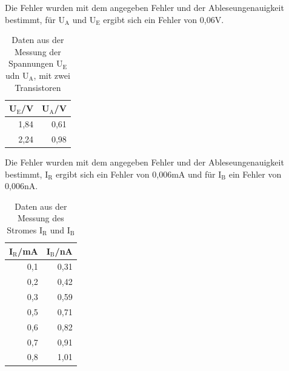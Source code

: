 \documentclass[12pt,a4paper]{article}
\begin{document}
Die Fehler wurden mit dem angegeben Fehler und der Ableseungenauigkeit bestimmt, für U$_\text{A}$ und U$_\text{E}$ ergibt sich ein Fehler von 0,06V.

\begin{table}[H]
\caption{Daten aus der Messung der Spannungen U$_\text{E}$ udn U$_\text{A}$, mit zwei Transistoren}
\begin{center}
\begin{tabular}{|r|r|}
\hline
\multicolumn{1}{|l|}{U$_\text{E}$/V} & \multicolumn{1}{l|}{U$_\text{A}$/V} \\ \hline
1,84 & 0,61 \\ \hline
2,24 & 0,98 \\ \hline
\end{tabular}
\end{center}
\label{tab:a_3b_u}
\end{table}

Die Fehler wurden mit dem angegeben Fehler und der Ableseungenauigkeit bestimmt, I$_\text{R}$ ergibt sich ein Fehler von 0,006mA und für I$_\text{B}$ ein Fehler von 0,006nA.

\begin{table}[H]
\caption{Daten aus der Messung des Stromes  I$_\text{R}$ und I$_\text{B}$}
\begin{center}
\begin{tabular}{|r|r|}
\hline
\multicolumn{1}{|l|}{I$_\text{R}$/mA} & \multicolumn{1}{l|}{I$_\text{B}$/nA} \\ \hline
0,1 & 0,31 \\ \hline
0,2 & 0,42 \\ \hline
0,3 & 0,59 \\ \hline
0,5 & 0,71 \\ \hline
0,6 & 0,82 \\ \hline
0,7 & 0,91 \\ \hline
0,8 & 1,01 \\ \hline
\end{tabular}
\end{center}
\label{tab:a_3b_i}
\end{table}
\end{document}
